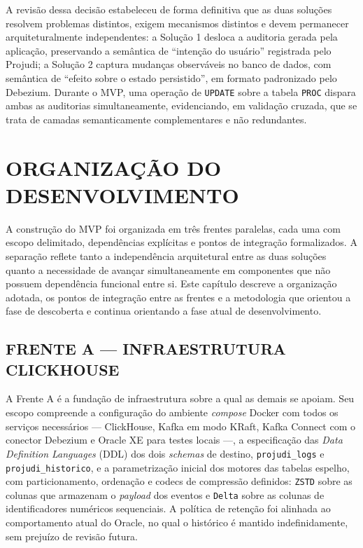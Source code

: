 \documentclass[12pt,letterpaper,oneside]{report}
\begin{document}
A revisão dessa decisão estabeleceu de forma definitiva que as duas soluções resolvem problemas distintos, exigem mecanismos distintos e devem permanecer arquiteturalmente independentes: a Solução 1 desloca a auditoria gerada pela aplicação, preservando a semântica de “intenção do usuário” registrada pelo Projudi; a Solução 2 captura mudanças observáveis no banco de dados, com semântica de “efeito sobre o estado persistido”, em formato padronizado pelo Debezium. Durante o MVP, uma operação de \texttt{UPDATE} sobre a tabela \texttt{PROC} dispara ambas as auditorias simultaneamente, evidenciando, em validação cruzada, que se trata de camadas semanticamente complementares e não redundantes.


\chapter{ORGANIZAÇÃO DO DESENVOLVIMENTO}

A construção do MVP foi organizada em três frentes paralelas, cada uma com escopo delimitado, dependências explícitas e pontos de integração formalizados. A separação reflete tanto a independência arquitetural entre as duas soluções quanto a necessidade de avançar simultaneamente em componentes que não possuem dependência funcional entre si. Este capítulo descreve a organização adotada, os pontos de integração entre as frentes e a metodologia que orientou a fase de descoberta e continua orientando a fase atual de desenvolvimento.

\section{FRENTE A — INFRAESTRUTURA CLICKHOUSE}

A Frente A é a fundação de infraestrutura sobre a qual as demais se apoiam. Seu escopo compreende a configuração do ambiente \textit{compose} Docker com todos os serviços necessários — ClickHouse, Kafka em modo KRaft, Kafka Connect com o conector Debezium e Oracle XE para testes locais —, a especificação das \textit{Data Definition Languages} (DDL) dos dois \textit{schemas} de destino, \texttt{projudi\_logs} e \texttt{projudi\_historico}, e a parametrização inicial dos motores das tabelas espelho, com particionamento, ordenação e codecs de compressão definidos: \texttt{ZSTD} sobre as colunas que armazenam o \textit{payload} dos eventos e \texttt{Delta} sobre as colunas de identificadores numéricos sequenciais. A política de retenção foi alinhada ao comportamento atual do Oracle, no qual o histórico é mantido indefinidamente, sem prejuízo de revisão futura.
\end{document}

